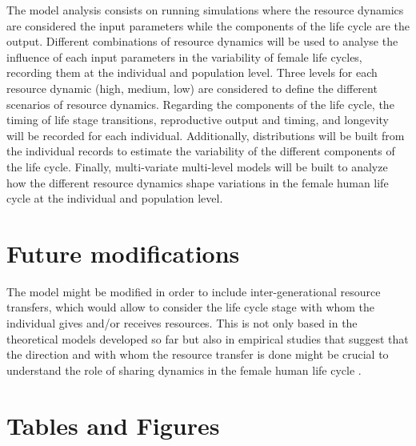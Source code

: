 \documentclass{article}
\begin{document}
The model analysis consists on running simulations where the resource dynamics are considered the input parameters while the components of the life cycle are the output. Different combinations of resource dynamics will be used to analyse the influence of each input parameters in the variability of female life cycles, recording them at the individual and population level. Three levels for each resource dynamic (high, medium, low) are considered to define the different scenarios of resource dynamics. Regarding the components of the life cycle, the timing of life stage transitions, reproductive output and timing, and longevity will be recorded for each individual. Additionally, distributions will be built from the individual records to estimate the variability of the different components of the life cycle. Finally, multi-variate multi-level models will be built to analyze how the different resource dynamics shape variations in the female human life cycle at the individual and population level.

\section{Future modifications}

The model might be modified in order to include inter-generational resource transfers, which would allow to consider the life cycle stage with whom the individual gives and/or receives resources. This is not only based in the theoretical models developed so far \citep{lee2003rethinking,chu2006co} but also in empirical studies that suggest that the direction and with whom the resource transfer is done might be crucial to understand the role of sharing dynamics in the female human life cycle \citep{hooper2015inclusive,jones2015resource}.

\section{Tables and Figures}
\end{document}
